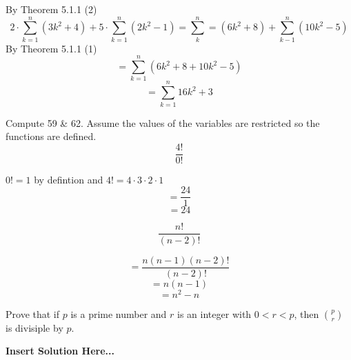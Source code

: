 \documentclass[12pt,letterpaper, onecolumn]{exam}
\begin{document}
\begin{questions}
		\begin{solution}
		By Theorem 5.1.1 (2)
		$$2\cdot\sum^{n}_{k=1}(3k^2+4)+5\cdot\sum^{n}_{k=1}(2k^2-1)=\sum^{n}_k=(6k^2+8)+\sum^{n}_{k-1}(10k^2-5)$$
				By Theorem 5.1.1 (1)
				$$=\sum^{n}_{k=1}(6k^2+8+10k^2-5)$$
								$$=\sum^{n}_{k=1}16k^2+3$$
		\end{solution}
		
		Compute 59 \& 62. Assume the values of the variables are restricted so the functions are defined.
		\setcounter{question}{58} \question $$\frac{4!}{0!}$$
		
		\begin{solution}
		$0!=1$ by defintion and $4!=4\cdot3\cdot2\cdot1$
		$$=\frac{24}{1}$$
		$$=24$$
		\end{solution}
		
		\setcounter{question}{61} \question $$\frac{n!}{(n-2)!}$$
		
		\begin{solution}
		$$=\frac{n(n-1)(n-2)!}{(n-2)!}$$
		$$=n(n-1)$$
		$$=n^2-n$$
		\end{solution}
		
		\setcounter{question}{73} \question Prove that if $p$ is a prime number and $r$ is an integer with $0<r<p$, then $\binom{p}{r}$ is divisiple by $p$.
		
		\begin{solution}
			\textbf{Insert Solution Here...}
		\end{solution}
	\end{questions}
\end{document}
